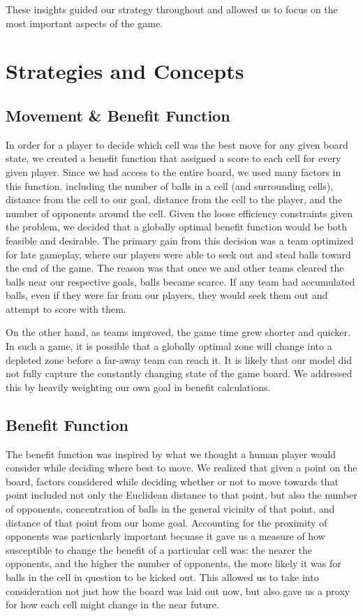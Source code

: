 \documentclass[
10pt, %
letterpaper, %
oneside, %
headinclude,footinclude, %
english
]{article}
\begin{document}
These insights guided our strategy throughout and allowed us to focus on the most important aspects of the game.

\section{Strategies and Concepts}

\subsection {Movement \& Benefit Function}

In order for a player to decide which cell was the best move for any given board state, we created a benefit function that assigned a score to each cell for every given player. Since we had access to the entire board, we used many factors in this function, including the number of balls in a cell (and surrounding cells), distance from the cell to our goal, distance from the cell to the player, and the number of opponents around the cell. Given the loose efficiency constraints given the problem, we decided that a globally optimal benefit function would be both feasible and desirable. The primary gain from this decision was a team optimized for late gameplay, where our players were able to seek out and steal balls toward the end of the game. The reason was that once we and other teams cleared the balls near our respective goals, balls became scarce. If any team had accumulated balls, even if they were far from our players, they would seek them out and attempt to score with them.

On the other hand, as teams improved, the game time grew shorter and quicker. In such a game, it is possible that a globally optimal zone will change into a depleted zone before a far-away team can reach it. It is likely that our model did not fully capture the constantly changing state of the game board. We addressed this by heavily weighting our own goal in benefit calculations.

\subsection{Benefit Function}
The benefit function was inspired by what we thought a human player would consider while deciding where best to move. We realized that given a point on the board, factors considered while deciding whether or not to move towards that point included not only the Euclidean distance to that point, but also the number of opponents, concentration of balls in the general vicinity of that point, and distance of that point from our home goal. Accounting for the proximity of opponents was particularly important becuase it gave us a measure of how susceptible to change the benefit of a particular cell was: the nearer the opponents, and the higher the number of opponents, the more likely it was for balls in the cell in question to be kicked out. This allowed us to take into consideration not just how the board was laid out now, but also gave us a proxy for how each cell might change in the near future.
\end{document}
